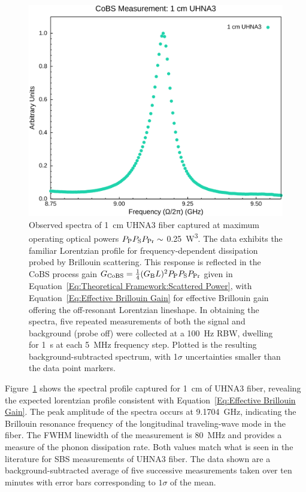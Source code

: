 \begin{figure}[t!]
  \centering
  \hspace{-2em}\includegraphics[width=.85\textwidth]{figs/3-CoBS/CoBS Measurement: 1 cm UHNA3.png}
  \caption{Observed spectra of \SI{1}{\centi\meter} \ac{UHNA3} fiber captured at maximum operating optical powers \(P_{\rm P}P_{\rm S}P_{\rm Pr} \sim\) \SI{0.25}{\cubic\watt}. The data exhibits the familiar Lorentzian profile for frequency-dependent dissipation probed by Brillouin scattering. This response is reflected in the \ac{CoBS} process gain \(G_{\rm CoBS}=\frac{1}{4}(G_{\rm B}L)^{2}P_{\rm P}P_{\rm S}P_{\rm Pr}\) given in Equation~\ref{Eq:Theoretical Framework:Scattered Power}, with Equation~\ref{Eq:Effective Brillouin Gain} for effective Brillouin gain offering the off-resonant Lorentzian lineshape. In obtaining the spectra, five repeated measurements of both the signal and background (probe off) were collected at a \SI{100}{\hertz} \ac{RBW}, dwelling for \SI{1}{\second} at each \SI{5}{\mega\hertz} frequency step. Plotted is the resulting background-subtracted spectrum, with 1\(\sigma\) uncertainties smaller than the data point markers.}
  \label{fig:1cmUHNA3}
\end{figure}

Figure~\ref{fig:1cmUHNA3} shows the spectral profile captured for \SI{1}{\centi\meter} of \ac{UHNA3} fiber, revealing the expected lorentzian profile consistent with Equation~\ref{Eq:Effective Brillouin Gain}. The peak amplitude of the spectra occurs at \SI{9.1704}{\giga\hertz}, indicating the Brillouin resonance frequency of the longitudinal traveling-wave mode in the fiber. The \ac{FWHM} linewidth of the measurement is \SI{80}{\mega\hertz} and provides a measure of the phonon dissipation rate. Both values match what is seen in the literature for \ac{SBS} measurements of \ac{UHNA3} fiber.\cite{behunin2015long} The data shown are a background-subtracted average of five successive measurements taken over ten minutes with error bars corresponding to \(1\sigma\) of the mean.

